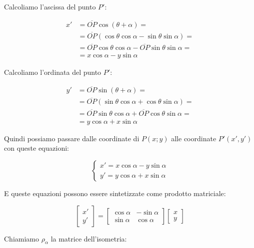 Calcoliamo l'ascissa del punto $P'$:

\begin{align}
	x' & = \overline{OP} \cos (\theta + \alpha) = \\
	& = \overline{OP} ( \cos \theta \cos \alpha - \sin \theta \sin \alpha) = \\
	& = \overline{OP} \cos \theta \cos \alpha - \overline{OP} \sin \theta \sin \alpha = \\
	& = x \cos \alpha - y \sin \alpha
\end{align}
 
Calcoliamo l'ordinata del punto $P'$:

\begin{align}
	y' & = \overline{OP} \sin (\theta + \alpha) = \\
	& = \overline{OP} ( \sin \theta \cos \alpha + \cos \theta \sin \alpha) = \\
	& = \overline{OP} \sin \theta \cos \alpha + \overline{OP} \cos \theta \sin \alpha = \\
	& = y \cos \alpha + x \sin \alpha
\end{align}

Quindi possiamo passare dalle coordinate di $P(x; y)$ alle coordinate $P'(x', y')$ con queste equazioni:

\begin{equation}
	\begin{cases}
		x' = x \cos \alpha - y \sin \alpha \\
		y' = y \cos \alpha + x \sin \alpha
	\end{cases}
\end{equation}

E queste equazioni possono essere sintetizzate come prodotto matriciale:

\begin{equation}
	\begin{bmatrix}
		x' \\
		y' 
	\end{bmatrix}
	=
	\begin{bmatrix}
		\cos \alpha & -\sin \alpha \\
		\sin \alpha & \cos \alpha
	\end{bmatrix}
	\begin{bmatrix}
		x \\
		y 
	\end{bmatrix}
\end{equation}

Chiamiamo $\rho_\alpha$ la matrice dell'isometria:

